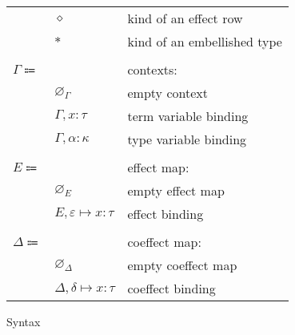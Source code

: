\documentclass[12pt]{article}
\newcommand\anno[2]{#1 : #2}
\newcommand\evar{x}
\newcommand\type{\tau}
\newcommand\tvar{\alpha}
\newcommand\kind{\kappa}
\newcommand\krow{\diamond}
\newcommand\ktembellished{\ast}
\newcommand\context{\Gamma}
\newcommand\cempty{\varnothing_{\context}}
\newcommand\cextend[2]{#1, #2}
\newcommand\effect{\varepsilon}
\newcommand\coeffect{\delta}
\newcommand\effectmap{E}
\newcommand\coeffectmap{\Delta}
\newcommand\emempty{\varnothing_{\effectmap}}
\newcommand\ecomempty{\varnothing_{\coeffectmap}}
\newcommand\emmap[2]{#1 \mapsto #2}
\newcommand\emextend[2]{#1, #2}
\begin{document}
\begin{figure}
\begin{mdframed}[backgroundcolor=none]
\begin{center}
\begin{tabular}{l l l}
          & $\krow$ & kind of an effect row \\
          & $\ktembellished$ & kind of an embellished type \\
          \\
          $\context \Coloneqq$ & & contexts: \\
          & $\cempty$ & empty context \\
          & $\cextend{\context}{\anno{\evar}{\type}}$ & term variable binding \\
          & $\cextend{\context}{\anno{\tvar}{\kind}}$ & type variable binding \\
          \\
          $\effectmap \Coloneqq$ & & effect map: \\
          & $\emempty$ & empty effect map \\
          & $\emextend{\effectmap}{\emmap{\effect}{\anno{\evar}{\type}}}$ & effect binding \\
          \\
          $\coeffectmap \Coloneqq$ & & coeffect map: \\
          & $\ecomempty$ & empty coeffect map \\
          & $\emextend{\coeffectmap}{\emmap{\coeffect}{\anno{\evar}{\type}}}$ & coeffect binding \\
        \end{tabular}
      \end{center}

      \caption{Syntax}\label{fig:syntax}
    \end{mdframed}
  \end{figure}
\end{document}
